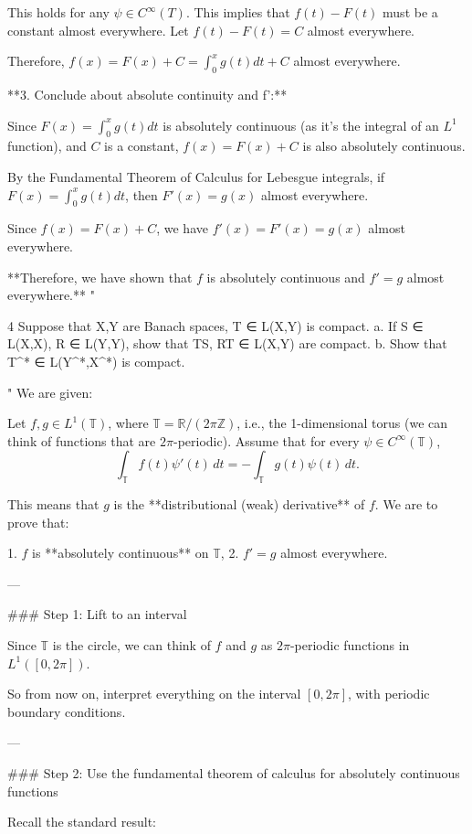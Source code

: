This holds for any $\psi \in C^\infty(T)$.  This implies that $f(t) - F(t)$ must be a constant almost everywhere. Let $f(t) - F(t) = C$ almost everywhere.

Therefore, $f(x) = F(x) + C = \int_0^x g(t) dt + C$ almost everywhere.

**3. Conclude about absolute continuity and f':**

Since $F(x) = \int_0^x g(t) dt$ is absolutely continuous (as it's the integral of an $L^1$ function), and $C$ is a constant, $f(x) = F(x) + C$ is also absolutely continuous.

By the Fundamental Theorem of Calculus for Lebesgue integrals, if $F(x) = \int_0^x g(t) dt$, then $F'(x) = g(x)$ almost everywhere.

Since $f(x) = F(x) + C$, we have $f'(x) = F'(x) = g(x)$ almost everywhere.

**Therefore, we have shown that $f$ is absolutely continuous and $f' = g$ almost everywhere.**
"

4 Suppose that X,Y are Banach spaces, T ∈ L(X,Y) is compact.
a. If S ∈ L(X,X), R ∈ L(Y,Y), show that TS, RT ∈ L(X,Y) are compact.
b. Show that T^* ∈ L(Y^*,X^*) is compact.

"
We are given:

Let \( f, g \in L^1(\mathbb{T}) \), where \( \mathbb{T} = \mathbb{R} / (2\pi\mathbb{Z}) \), i.e., the 1-dimensional torus (we can think of functions that are \( 2\pi \)-periodic).  
Assume that for every \( \psi \in C^\infty(\mathbb{T}) \),
\[
\int_{\mathbb{T}} f(t) \psi'(t) \, dt = - \int_{\mathbb{T}} g(t) \psi(t) \, dt.
\]

This means that \( g \) is the **distributional (weak) derivative** of \( f \). We are to prove that:

1. \( f \) is **absolutely continuous** on \( \mathbb{T} \),
2. \( f' = g \) almost everywhere.

---

### Step 1: Lift to an interval

Since \( \mathbb{T} \) is the circle, we can think of \( f \) and \( g \) as \( 2\pi \)-periodic functions in \( L^1([0, 2\pi]) \).

So from now on, interpret everything on the interval \( [0, 2\pi] \), with periodic boundary conditions.

---

### Step 2: Use the fundamental theorem of calculus for absolutely continuous functions

Recall the standard result:

